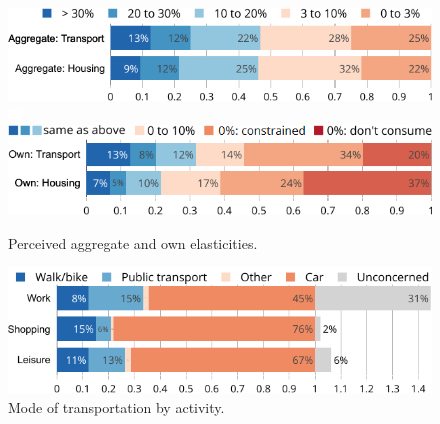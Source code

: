 \documentclass[english,5p,authoryear]{elsarticle}
\begin{document}
\begin{figure}[t]
\centering
\includegraphics[width=\columnwidth]{Images/elasticities_agg_valb.png}
\includegraphics[height=0.3cm]{Images/blank.png}
\includegraphics[width=\columnwidth]{Images/elasticities_perso_valbuena.png}
\caption{Perceived aggregate and own elasticities.}
\label{fig:elasticities_agg}
\end{figure}

\begin{figure}[b]
\centering
\includegraphics[width=\columnwidth]{Images/transports_use_trim.png}
\caption{Mode of transportation by activity.}
\label{fig:transports_use}
\end{figure}
\end{document}
